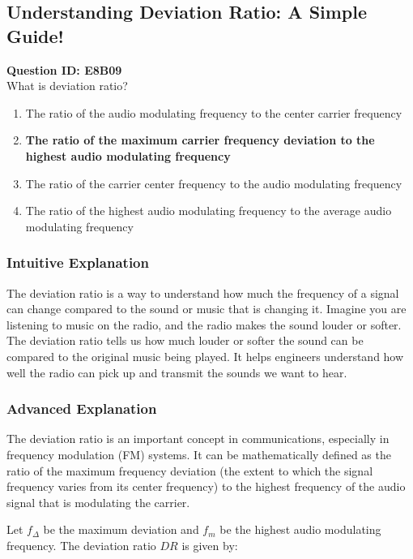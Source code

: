 \subsection{Understanding Deviation Ratio: A Simple Guide!}

\begin{tcolorbox}
    \textbf{Question ID: E8B09} \\
    What is deviation ratio? \\ 
    \begin{enumerate}[label=\Alph*.]
        \item The ratio of the audio modulating frequency to the center carrier frequency
        \item \textbf{The ratio of the maximum carrier frequency deviation to the highest audio modulating frequency}
        \item The ratio of the carrier center frequency to the audio modulating frequency
        \item The ratio of the highest audio modulating frequency to the average audio modulating frequency
    \end{enumerate}
\end{tcolorbox}

\subsubsection{Intuitive Explanation}
The deviation ratio is a way to understand how much the frequency of a signal can change compared to the sound or music that is changing it. Imagine you are listening to music on the radio, and the radio makes the sound louder or softer. The deviation ratio tells us how much louder or softer the sound can be compared to the original music being played. It helps engineers understand how well the radio can pick up and transmit the sounds we want to hear.

\subsubsection{Advanced Explanation}
The deviation ratio is an important concept in communications, especially in frequency modulation (FM) systems. It can be mathematically defined as the ratio of the maximum frequency deviation (the extent to which the signal frequency varies from its center frequency) to the highest frequency of the audio signal that is modulating the carrier.

Let \( f_{\Delta} \) be the maximum deviation and \( f_m \) be the highest audio modulating frequency. The deviation ratio \( DR \) is given by:

